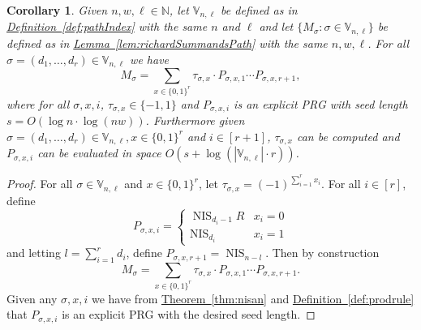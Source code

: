 \documentclass[11pt]{article}
\numberwithin{equation}{section}
\newtheorem{corollary}[theorem]{Corollary}
\theoremstyle{definition}
\theoremstyle{plain}
\newcommand{\N}{\mathbb N}
\newcommand{\expref}[2]{\hyperref[#2]{#1~\ref{#2}}}
\newcommand{\zo}{\{0,1\}}
\newcommand{\vnl}{\mathbb{V}_{n,\ell}}
\newcommand{\nis}[1][ ]{\operatorname{NIS}_{#1}}
\begin{document}
\begin{corollary}\label{cor:MstructPath}
Given $n,w,\ell \in \N$, let $\vnl$ be defined as in \expref{Definition}{def:pathIndex} with the same $n$ and $\ell$ and let $\{M_\sigma:\sigma\in\vnl\}$ be defined as in \expref{Lemma}{lem:richardSummandsPath} with the same $n,w,\ell$. For all $\sigma=(d_1,\dots,d_r)\in \vnl$ we have
\[M_\sigma=\sum_{x\in \zo^r}\tau_{\sigma,x}\cdot P_{\sigma,x,1}\cdots P_{\sigma,x,r+1},\]
where for all $\sigma,x,i$, $\tau_{\sigma,x}\in \{-1,1\}$ and $P_{\sigma,x,i}$ is an explicit PRG with seed length $s=O(\log n\cdot\log (nw))$.
Furthermore given $\sigma=(d_1,\dots,d_r)\in \vnl,x\in \zo^r$ and $i\in [r+1]$, $\tau_{\sigma,x}$ can be computed and $P_{\sigma,x,i}$ can be evaluated in space $O(s+\log(|\vnl|\cdot r))$.
\end{corollary}
\begin{proof}
For all $\sigma\in \vnl$ and $x\in \zo^{r}$, let $\tau_{\sigma,x}=(-1)^{\sum_{i=1}^{r}x_i}$. For all $i\in[r]$, define
\[P_{\sigma,x,i} = \begin{cases}
\nis[d_{i}-1]R & x_i=0\\
\nis[d_{i}] & x_i=1
\end{cases}\]
and letting $l=\sum_{i=1}^rd_i$, define $P_{\sigma,x,r+1}=\nis[n-l]$. Then by construction
\[M_\sigma=\sum_{x\in \zo^r}\tau_{\sigma,x}\cdot P_{\sigma,x,1}\cdots P_{\sigma,x,r+1}.\] 
Given any $\sigma,x,i$ we have from \expref{Theorem}{thm:nisan} and \expref{Definition}{def:prodrule} that $P_{\sigma,x,i}$ is an explicit PRG with the desired seed length.
\end{proof}
\end{document}
